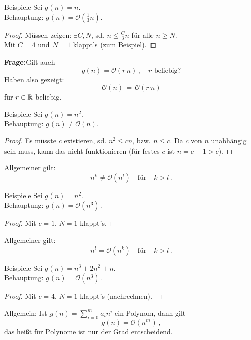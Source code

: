 \documentclass[aspectratio=169]{beamer}
\begin{document}
\begin{frame}{Beispiele}
  Sei $g(n) = n$.\\ Behauptung: $g(n) = \mathcal{O}(\frac{1}{3}n)$.\\[2ex]
  \pause
  \begin{proof}
    Müssen zeigen: $\exists C, N$, sd. $n \le \frac{C}{3}n$ für alle $n \ge N$.\\[2ex]
    \pause
    Mit $C = 4$ und $N = 1$ klappt's (zum Beispiel).
  \end{proof}
  \pause
  \textbf{Frage:}\quad Gilt auch
  \[
     g(n) = \mathcal{O}(r\,n)\,,\quad r \text{ beliebig?}
   \]
   \pause
   Haben also gezeigt:
   \[
     \mathcal{O}(n) \, = \, \mathcal{O}(r\,n)
   \]
   für $r \in \mathbb{R}$ beliebig.
 \end{frame}

 \begin{frame}{Beispiele}
  Sei $g(n) = n^2$.\\ Behauptung: $g(n) \neq \mathcal{O}(n)$.\\[2ex]
  \pause
  \begin{proof}
    Es müsste $c$ existieren, sd. $n^2 \le cn$, bzw.
    $n \le c$.
    \pause
    Da $c$ von $n$ unabhängig sein muss, kann das nicht funktionieren
    (für festes $c$ ist $n = c+1 > c$).
  \end{proof}
  \pause
  Allgemeiner gilt:
  \[
    n^k \neq \mathcal{O}(n^l) \quad \text{für} \quad k > l \,.
  \]
\end{frame}

\begin{frame}{Beispiele}
  Sei $g(n) = n^2$.\\ Behauptung: $g(n) = \mathcal{O}(n^3)$.\\[2ex]
  \pause
  \begin{proof}
    Mit $c = 1$, $N = 1$ klappt's.
  \end{proof}
  \pause
  Allgemeiner gilt:
  \[
    n^l = \mathcal{O}(n^k) \quad \text{für} \quad k > l \,.
  \]
\end{frame}

\begin{frame}{Beispiele}
  Sei $g(n) = n^3 + 2n^2 + n$.\\ Behauptung: $g(n) = \mathcal{O}(n^3)$.\\[2ex]
  \pause
  \begin{proof}
    Mit $c = 4$, $N = 1$ klappt's (nachrechnen).
  \end{proof}
  \pause
  Allgemein: Ist $g(n) = \sum_{i=0}^m a_i n^i$ ein Polynom, dann gilt
  \[
    g(n) = \mathcal{O}(n^m)\,,
  \]
  das heißt für Polynome ist nur der Grad entscheidend.
\end{frame}
\end{document}
